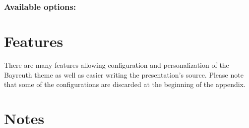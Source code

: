 \documentclass[11pt]{ltxdoc}
\begin{document}
	\subsubsection*{Available options:}

	
	
	\section{Features}
	There are many features allowing configuration and personalization of the Bayreuth theme as well as easier writing the presentation's source. Please note that some of the configurations are discarded at the beginning of the appendix.
	
	
	
	
	\section{Notes}

	
	
	\vfill
	\thispagestyle{empty}
	\listoffigures
	\listoftables
\end{document}
